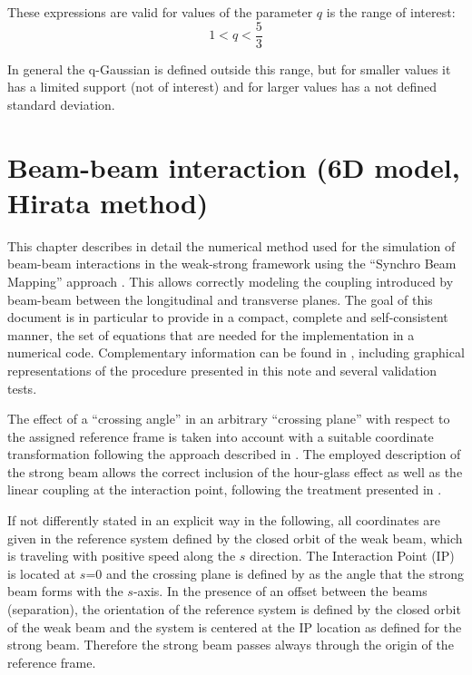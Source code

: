 These expressions are valid for values of the parameter $q$ is   the range of interest:
\begin{equation}
1<q<\frac{5}{3}
\end{equation}

In general the q-Gaussian is defined outside this range, but for smaller values it has a limited support (not of interest) and for larger values has a not defined standard deviation.

\section{Beam-beam interaction (6D model, Hirata method)}

This chapter describes in detail the numerical method used for the simulation of beam-beam interactions in the weak-strong framework using the ``Synchro Beam Mapping'' 
approach \cite{hirata, hirata_crossing_angle}.  This allows correctly modeling the coupling introduced by beam-beam between the longitudinal and transverse planes. The goal of this document is  in particular to provide in a compact, complete and self-consistent manner, the set of equations that are needed for the implementation in a numerical code. 
Complementary information can be found in \cite{bb6dslides}, including graphical representations of the procedure presented in this note and several validation tests.

The effect of a ``crossing angle'' in an arbitrary ``crossing plane'' with respect to the assigned reference frame is taken into account with a suitable coordinate transformation following the approach described in \cite{hirata, beam_beam}. The employed description of the strong beam allows the correct inclusion of the hour-glass effect as well as the linear coupling at the interaction point, following the treatment presented in \cite{beam_beam}. 


If not differently stated in an explicit way in the following, all coordinates are given in the reference system defined by the closed orbit of the weak beam, which is traveling with positive speed along the $s$ direction. The Interaction Point (IP) is located at $s$=0 and the crossing plane is defined by as the angle that the strong beam forms with the $s$-axis. In the presence of an offset between the beams (separation), the orientation of the reference system is defined by the closed orbit of the weak beam and the system is centered at the IP location as defined for the strong beam. Therefore the strong beam passes always through the origin of the reference frame.


